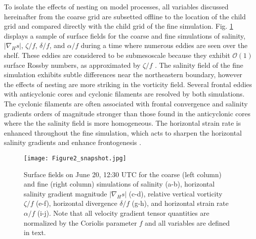 \documentclass[draft]{agujournal2019}
\begin{document}
To isolate the effects of nesting on model processes, all variables discussed hereinafter from the coarse grid are subsetted offline to the location of the child grid and compared directly with the child grid of the fine simulation. Fig. \ref{fig:surface_snapshots} displays a sample of surface fields for the coarse and fine simulations of salinity, $|\nabla_H s|$, $\zeta/f$, $\delta/f$, and $\alpha/f$ during a time where numerous eddies are seen over the shelf. These eddies are considered to be submesoscale because they exhibit $\mathcal{O}(1)$ surface Rossby numbers, as approximated by $\zeta/f$ \cite{Barkan_2017, Kobashi_2020, McWilliams_2016}. The salinity field of the fine simulation exhibits subtle differences near the northeastern boundary, however the effects of nesting are more striking in the vorticity field. Several frontal eddies with anticyclonic cores and cyclonic filaments are resolved by both simulations. The cyclonic filaments are often associated with frontal convergence \cite{Kobashi_2020} and salinity gradients orders of magnitude stronger than those found in the anticyclonic cores where the the salinity field is more homogeneous. The horizontal strain rate is enhanced throughout the fine simulation, which acts to sharpen the horizontal salinity gradients and enhance frontogenesis \cite{Hoskins_1972}.

\begin{figure} 
 \centerline{\texttt{[image: Figure2\_snapshot.jpg]}}
  \caption{Surface fields on June 20, 12:30 UTC for the coarse (left column) and fine (right column) simulations of salinity (a-b), horizontal salinity gradient magnitude $|\nabla_H s|$ (c-d), relative vertical vorticity $\zeta/f$ (e-f), horizontal divergence $\delta/f$ (g-h), and horizontal strain rate $\alpha/f$ (i-j). Note that all velocity gradient tensor quantities are normalized by the Coriolis parameter $f$ and all variables are defined in text.}
  \label{fig:surface_snapshots}
\end{figure} 
\end{document}
